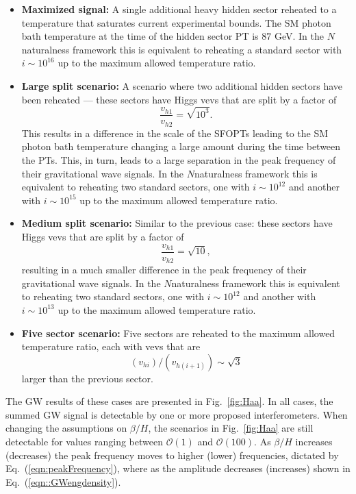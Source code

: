 \documentclass[nofootinbib,twocolumn,preprintnumbers]{revtex4-1}
\begin{document}
\begin{itemize}
\item \textbf{Maximized signal:} A single additional heavy hidden sector reheated to a temperature that saturates current experimental bounds. The SM photon bath temperature at the time of the hidden sector PT is $87$ GeV. In the $N$naturalness framework this is equivalent to reheating a standard sector with $i\sim 10^{16}$ up to the maximum allowed temperature ratio.

\item \textbf{Large split scenario:} A scenario where two additional hidden sectors have been reheated --- these sectors have Higgs vevs that are split by a factor of 
\begin{equation}
 \frac{v_{h1}}{v_{h2}} = \sqrt{10^3}.
\end{equation}
This results in a difference in the scale of the SFOPTs leading to the SM photon bath temperature changing a large amount during the time between the PTs. This, in turn, leads to a large separation in the peak frequency of their gravitational wave signals.  In the $N$naturalness framework this is equivalent to reheating two standard sectors, one with $i\sim 10^{12}$ and another with $i\sim 10^{15}$ up to the maximum allowed temperature ratio.

\item \textbf{Medium split scenario:} Similar to the previous case: these sectors have Higgs vevs that are split by a factor of 
 \begin{equation}
 \frac{v_{h1}}{v_{h2}} = \sqrt{10},
\end{equation}
resulting in a much smaller difference in the peak frequency of their gravitational wave signals. In the $N$naturalness framework this is equivalent to reheating two standard sectors, one with $i\sim 10^{12}$ and another with $i\sim 10^{13}$ up to the maximum allowed temperature ratio.

\item \textbf{Five sector scenario:} Five sectors are reheated to the maximum allowed temperature ratio, each with vevs that are 
\begin{equation}
 (v_{hi})/(v_{h(i+1)}) \sim \sqrt{3} 
\end{equation}
 larger than the previous sector.

\end{itemize}

The GW results of these cases are presented in Fig.~\ref{fig:Haa}. In all cases, the summed GW signal is detectable by one or more proposed interferometers. When changing the assumptions on $\beta/H$, the scenarios in Fig.~\ref{fig:Haa} are still detectable for values ranging between $\mathcal{O}(1)$ and $\mathcal{O}(100)$. As $\beta/H$ increases (decreases) the peak frequency moves to higher (lower) frequencies, dictated by Eq.~(\ref{eqn:peakFrequency}), where as the amplitude decreases (increases) shown in Eq.~(\ref{eqn::GWengdensity}).
\end{document}
